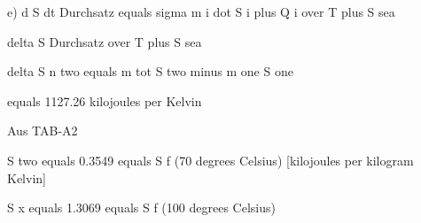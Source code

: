 e) d S dt Durchsatz equals sigma m i dot S i plus Q i over T plus S sea

delta S Durchsatz over T plus S sea

delta S n two equals m tot S two minus m one S one

equals 1127.26 kilojoules per Kelvin

Aus TAB-A2

S two equals 0.3549 equals S f (70 degrees Celsius) [kilojoules per kilogram Kelvin]

S x equals 1.3069 equals S f (100 degrees Celsius)